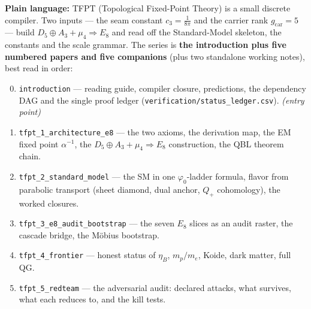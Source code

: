 \begin{navbox}
\textbf{Plain language:} TFPT (Topological Fixed-Point Theory) is a small discrete compiler. Two
inputs --- the seam constant $c_3=\tfrac1{8\pi}$ and the carrier rank $g_{\mathrm{car}}=5$ --- build
$D_5\oplus A_3+\mu_4\Rightarrow E_8$ and read off the Standard-Model skeleton, the constants and the
scale grammar. The series is \textbf{the introduction plus five numbered papers and five companions}
(plus two standalone working notes), best read in order:
\begin{enumerate}[leftmargin=2.0em,itemsep=1pt,label=\textbf{\arabic*.}]
\setcounter{enumi}{-1}
\item \texttt{introduction} --- reading guide, compiler closure, predictions, the dependency DAG and the
      single proof ledger (\texttt{verification/status\_ledger.csv}). \emph{(entry point)}
\item \texttt{tfpt\_1\_architecture\_e8} --- the two axioms, the derivation map, the EM fixed point
      $\alpha^{-1}$, the $D_5\oplus A_3+\mu_4\Rightarrow E_8$ construction, the QBL theorem chain.
\item \texttt{tfpt\_2\_standard\_model} --- the SM in one $\varphi_0$-ladder formula, flavor from
      parabolic transport (sheet diamond, dual anchor, $Q_+$ cohomology), the worked closures.
\item \texttt{tfpt\_3\_e8\_audit\_bootstrap} --- the seven $E_8$ slices as an audit raster, the cascade
      bridge, the M\"obius bootstrap.
\item \texttt{tfpt\_4\_frontier} --- honest status of $\eta_B$, $m_p/m_e$, Koide, dark matter, full QG.
\item \texttt{tfpt\_5\_redteam} --- the adversarial audit: declared attacks, what survives, what each
      reduces to, and the kill tests.
\end{enumerate}

\end{navbox}
